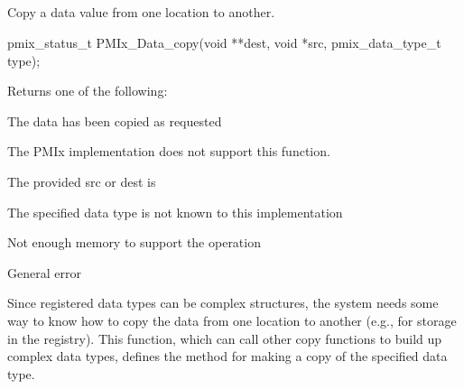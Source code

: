 \subsection{}

\summary

Copy a data value from one location to another.

\format

\cspecificstart
\begin{codepar}
pmix_status_t
PMIx_Data_copy(void **dest, void *src,
               pmix_data_type_t type);
\end{codepar}
\cspecificend

\begin{arglist}
\end{arglist}

Returns one of the following:
\begin{constantdesc}
\item {} The data has been copied as requested
\item {} The \ac{PMIx} implementation does not support this function.
\item {} The provided src or dest is 
\item {} The specified data type is not known to this implementation
\item {} Not enough memory to support the operation
\item {} General error
\end{constantdesc}

\descr

Since registered data types can be complex structures, the system needs some way to know how to copy the data from one location to another (e.g., for storage in the registry). This function, which can call other copy functions to build up complex data types, defines the method for making a copy of the specified data type.


